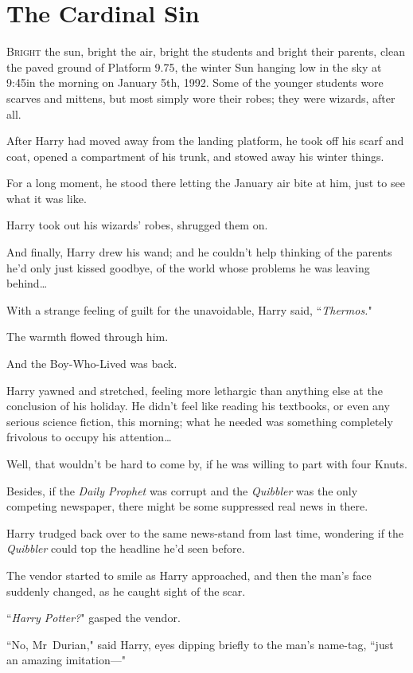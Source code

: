\chapter{The Cardinal Sin}

\lettrine{B}{right} the sun, bright the air, bright the students and bright their parents, clean the paved ground of Platform 9.75, the winter Sun hanging low in the sky at 9:45\am in the morning on January 5th, 1992. Some of the younger students wore scarves and mittens, but most simply wore their robes; they were wizards, after all.

After Harry had moved away from the landing platform, he took off his scarf and coat, opened a compartment of his trunk, and stowed away his winter things.

For a long moment, he stood there letting the January air bite at him, just to see what it was like.

Harry took out his wizards' robes, shrugged them on.

And finally, Harry drew his wand; and he couldn't help thinking of the parents he'd only just kissed goodbye, of the world whose problems he was leaving behind{\ldots}

With a strange feeling of guilt for the unavoidable, Harry said, ``\emph{Thermos.}"

The warmth flowed through him.

And the Boy-Who-Lived was back.

Harry yawned and stretched, feeling more lethargic than anything else at the conclusion of his holiday. He didn't feel like reading his textbooks, or even any serious science fiction, this morning; what he needed was something completely frivolous to occupy his attention{\ldots}

Well, that wouldn't be hard to come by, if he was willing to part with four Knuts.

Besides, if the \emph{Daily Prophet} was corrupt and the \emph{Quibbler} was the only competing newspaper, there might be some suppressed real news in there.

Harry trudged back over to the same news-stand from last time, wondering if the \emph{Quibbler} could top the headline he'd seen before.

The vendor started to smile as Harry approached, and then the man's face suddenly changed, as he caught sight of the scar.

``\emph{Harry Potter?}" gasped the vendor.

``No, Mr~Durian," said Harry, eyes dipping briefly to the man's name-tag, ``just an amazing imitation—"

